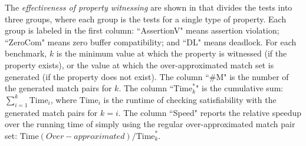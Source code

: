 The \textit{effectiveness of property witnessing} are shown in  that divides the tests into three groups, where each group is the tests for a single type of property. Each group is labeled in the first column: ``AssertionV" means assertion violation; ``ZeroCom" means zero buffer compatibility; and ``DL" means deadlock. For each benchmark, $k$ is the minimum value at which the property is witnessed (if the property exists), or the value at which the over-approximated match set is generated (if the property does not exist). 
The column ``\#M" is the number of the generated match pairs for $k$. 
The column ``$\mathrm{Time}_k^\ast$" is the cumulative sum: $\sum_{i=1}^k\mathrm{Time}_i$, where $\mathrm{Time}_i$ is the runtime of checking satisfiability with the generated match pairs for $k=i$.
The column ``Speed" reports the relative speedup over the running time of simply using the regular over-approximated match pair set: $\mathrm{Time}(Over-approximated) / \mathrm{Time}_k^\ast$.

